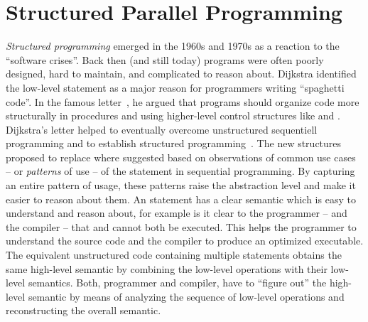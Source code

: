 \section{Structured Parallel Programming}
\emph{Structured programming} emerged in the 1960s and 1970s as a reaction to the ``software crises''.
Back then (and still today) programs were often poorly designed, hard to maintain, and complicated to reason about.
Dijkstra identified the low-level  statement as a major reason for programmers writing ``spaghetti code''.
In the famous letter~\cite{Dijkstra68a}, he argued that programs should organize code more structurally in procedures and using higher-level control structures like  and .
Dijkstra's letter helped to eventually overcome unstructured sequentiell programming and to establish structured programming~\cite{DahlDiHo1972}.
The new structures proposed to replace  where suggested based on observations of common use cases -- or \emph{patterns} of use -- of the  statement in sequential programming.
By capturing an entire pattern of usage, these patterns raise the abstraction level and make it easier to reason about them.
An  statement has a clear semantic which is easy to understand and reason about, for example is it clear to the programmer -- and the compiler -- that  and  cannot both be executed.
This helps the programmer to understand the source code and the compiler to produce an optimized executable.
The equivalent unstructured code containing multiple  statements obtains the same high-level semantic by combining the low-level operations with their low-level semantics.
Both, programmer and compiler, have to ``figure out'' the high-level semantic by means of analyzing the sequence of low-level operations and reconstructing the overall semantic.

